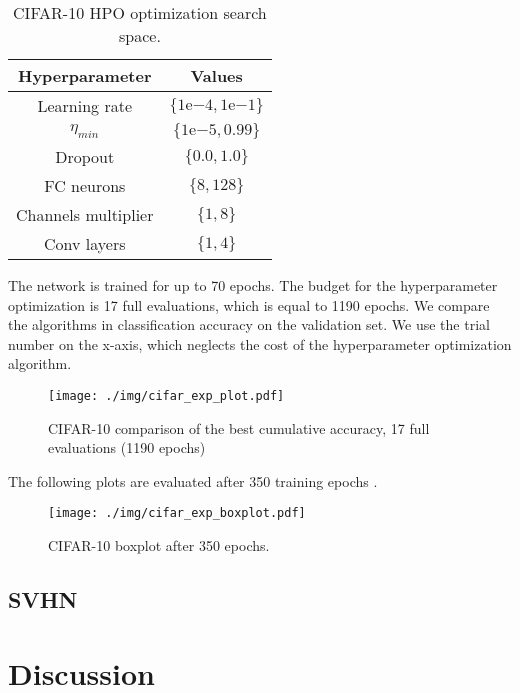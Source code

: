 \begin{table}[H]
    \centering
    \begin{tabular}{cc}
        \textbf{Hyperparameter} & \textbf{Values} \\ \midrule
        Learning rate & $\{1\mathrm{e}{-4}, 1\mathrm{e}{-1}\}$ \\
        $\eta_{min}$ & $\{1\mathrm{e}{-5}, 0.99\}$ \\
        Dropout & $\{0.0, 1.0\}$ \\
        FC neurons & $\{8, 128\}$ \\
        Channels multiplier & $\{1, 8\}$ \\
        Conv layers & $\{1, 4\}$ \\
    \end{tabular}
    \caption{CIFAR-10 HPO optimization search space.}
    \label{tc10}
\end{table}

The network is trained for up to 70 epochs. The budget for the hyperparameter optimization is 17 full evaluations, which is equal to 1190 epochs. We compare the algorithms in classification accuracy on the validation set. We use the trial number on the x-axis, which neglects the cost of the hyperparameter optimization algorithm.

\begin{figure}[H]
    \centering
    \texttt{[image: ./img/cifar\_exp\_plot.pdf]}
    \caption{CIFAR-10 comparison of the best cumulative accuracy, 17 full evaluations (1190 epochs)}
\end{figure}

The following plots are evaluated after 350 training epochs .

\begin{figure}[H]
    \centering
    \texttt{[image: ./img/cifar\_exp\_boxplot.pdf]}
    \caption{CIFAR-10 boxplot after 350 epochs.}
\end{figure}


\subsection{SVHN}


\section{Discussion}
